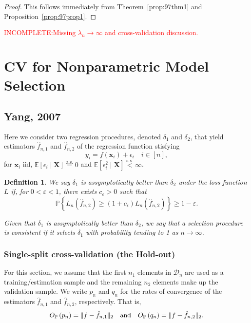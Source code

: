 \documentclass[12pt, letter paper]{article}
\newcommand{\1}{\mathmybb{1}}
\newtheorem{definition}{Definition}[section]
\newcommand{\0}{\emptyset}
\newcommand{\prob}{\mathbb{P}}
\newcommand{\Ep}[1]{\mathbb{E}\left[ #1 \right]}
\newcommand{\paren}[1]{\left(#1 \right)}
\newcommand{\set}[1]{\left\{ #1 \right\}}
\newcommand{\norm}[1]{|\hspace{-1pt}|#1 |\hspace{-1pt}|}
\newcommand{\data}{\mathcal{D}_{n}}
\newcommand{\aseq}{\stackrel{\mathrm{a.s.}}{=}}
\newcommand{\X}{\boldsymbol{X}}
\newcommand{\x}{\boldsymbol{x}}
\newcommand{\Loss}[1]{L_{n}\paren{#1}}
\newcommand{\Op}[1]{O_{\prob}\paren{#1}}
\newcommand{\fhat}[2]{\hat{f}_{#1, #2}}
\begin{document}
\begin{proof}
    This follows immediately from Theorem~\ref{prop:97thm1} and Proposition~\ref{prop:97prop1}.
\end{proof}

\textcolor{red}{INCOMPLETE:\@ Missing \(\lambda_{n}\to\infty\) and cross-validation discussion.}

\section{CV for Nonparametric Model Selection}

\subsection{Yang, 2007}

Here we consider two regression procedures, denoted \(\delta_{1}\) and \(\delta_{2}\), that yield estimators \(\hat{f}_{n, 1}\) and \(\hat{f}_{n, 2}\) of the regression function stisfying
\begin{equation}\label{eq:regressionmodel}
    y_{i} = f(\x_{i}) + \epsilon_{i}\quad i\in[n],
\end{equation}
for \(\x_{i}\) iid, \(\Ep{\epsilon_{i}\mid \X} \aseq 0\) and \(\Ep{\epsilon_{i}^{2}\mid \X} \stackrel{\text{a.s.}}{<} \infty\).

\begin{definition}
    We say \(\delta_{1}\) is \emph{assymptotically better} than \(\delta_{2}\) under the loss function \(L\) if, for \(0<\varepsilon<1\), there exists \(c_{\varepsilon}>0\) such that
    \[\prob\set{\Loss{\fhat{n}{2}}\geq (1+c_{\epsilon})\Loss{\fhat{n}{2}} }\geq 1-\varepsilon.\]

    Given that \(\delta_{1}\) is assymptotically better than \(\delta_{2}\), we say that a selection procedure is consistent if it selects \(\delta_{1}\) with probability tending to 1 as \(n\to\infty\).
\end{definition}


\subsubsection{Single-split cross-validation (the Hold-out)}

For this section, we assume that the first \(n_1\) elements in \(\data\) are used as a training/estimation sample and the remaining \(n_2\) elements make up the validation sample. We write \(p_{n}\) and \(q_{n}\) for the rates of convergence of the estimators \(\fhat{n}{1}\) and \(\fhat{n}{2}\), respectively. That is,
\[\Op{p_{n}} = \norm{f - \fhat{n}{1}}_{2}\quad\text{and}\quad \Op{q_{n}} = \norm{f- \fhat{n}{2}}_{2}.\]
\end{document}
